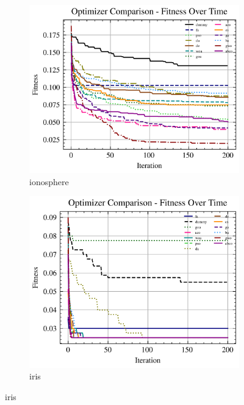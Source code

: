 \begin{figure}[htp]
    \begin{subfigure}[htp]{0.45\textwidth}
        \includegraphics[width=\textwidth]{imagenes/fitness_charts/img/binary/ionosphere/optimizers_fitness_knn.png}
        \caption{ionosphere}
        \label{fig:convergencia_ionosphere_knn}
    \end{subfigure}
    \begin{subfigure}[htp]{0.45\textwidth}
        \includegraphics[width=\textwidth]{imagenes/fitness_charts/img/binary/iris/optimizers_fitness_knn.png}
        \caption{iris}
        \label{fig:convergencia_iris_knn}
    \end{subfigure}


\end{figure}
